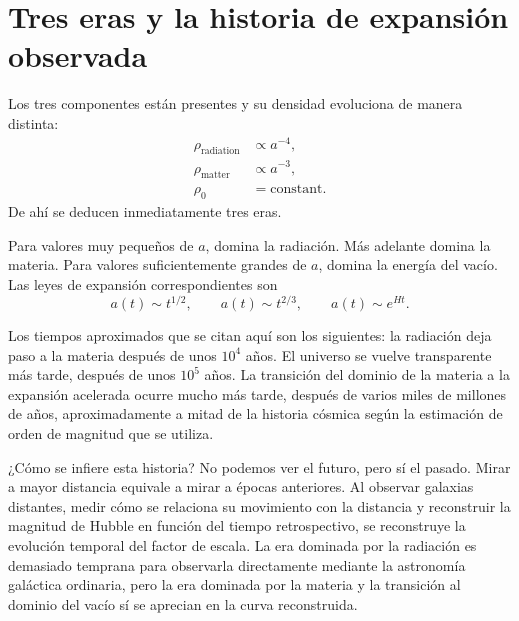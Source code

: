 \begin{classroomqa}
\end{classroomqa}

\section{Tres eras y la historia de expansión observada}

Los tres componentes están presentes y su densidad evoluciona de manera distinta:
\begin{equation}
\begin{aligned}
\rho_{\text{radiation}}&\propto a^{-4},\\
\rho_{\text{matter}}&\propto a^{-3},\\
\rho_0&=\text{constant}.
\end{aligned}
\end{equation}
De ahí se deducen inmediatamente tres eras.

Para valores muy pequeños de \(a\), domina la radiación. Más adelante domina la materia. Para valores suficientemente grandes de \(a\), domina la energía del vacío. Las leyes de expansión correspondientes son
\begin{equation}
a(t)\sim t^{1/2},
\qquad
a(t)\sim t^{2/3},
\qquad
a(t)\sim e^{Ht}.
\end{equation}

Los tiempos aproximados que se citan aquí son los siguientes: la radiación deja paso a la materia después de unos \(10^4\) años. El universo se vuelve transparente más tarde, después de unos \(10^5\) años. La transición del dominio de la materia a la expansión acelerada ocurre mucho más tarde, después de varios miles de millones de años, aproximadamente a mitad de la historia cósmica según la estimación de orden de magnitud que se utiliza.

¿Cómo se infiere esta historia? No podemos ver el futuro, pero sí el pasado. Mirar a mayor distancia equivale a mirar a épocas anteriores. Al observar galaxias distantes, medir cómo se relaciona su movimiento con la distancia y reconstruir la magnitud de Hubble en función del tiempo retrospectivo, se reconstruye la evolución temporal del factor de escala. La era dominada por la radiación es demasiado temprana para observarla directamente mediante la astronomía galáctica ordinaria, pero la era dominada por la materia y la transición al dominio del vacío sí se aprecian en la curva reconstruida.

